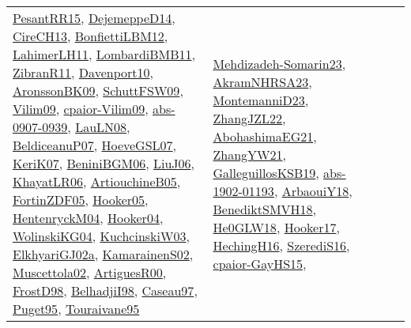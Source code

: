 {\begin{longtable}{lp{3cm}>{\raggedright}p{6cm}>{\raggedright}p{6cm}p{8cm}}
\href{papers/PesantRR15.pdf}{PesantRR15}\cite{PesantRR15}, \href{papers/DejemeppeD14.pdf}{DejemeppeD14}\cite{DejemeppeD14}, \href{papers/CireCH13.pdf}{CireCH13}\cite{CireCH13}, \href{papers/BonfiettiLBM12.pdf}{BonfiettiLBM12}\cite{BonfiettiLBM12}, \href{papers/LahimerLH11.pdf}{LahimerLH11}\cite{LahimerLH11}, \href{papers/LombardiBMB11.pdf}{LombardiBMB11}\cite{LombardiBMB11}, \href{papers/ZibranR11.pdf}{ZibranR11}\cite{ZibranR11}, \href{papers/Davenport10.pdf}{Davenport10}\cite{Davenport10}, \href{papers/AronssonBK09.pdf}{AronssonBK09}\cite{AronssonBK09}, \href{papers/SchuttFSW09.pdf}{SchuttFSW09}\cite{SchuttFSW09}, \href{papers/Vilim09.pdf}{Vilim09}\cite{Vilim09}, \href{papers/cpaior-Vilim09.pdf}{cpaior-Vilim09}\cite{cpaior-Vilim09}, \href{articles/abs-0907-0939.pdf}{abs-0907-0939}\cite{abs-0907-0939}, \href{papers/LauLN08.pdf}{LauLN08}\cite{LauLN08}, \href{papers/BeldiceanuP07.pdf}{BeldiceanuP07}\cite{BeldiceanuP07}, \href{papers/HoeveGSL07.pdf}{HoeveGSL07}\cite{HoeveGSL07}, \href{papers/KeriK07.pdf}{KeriK07}\cite{KeriK07}, \href{papers/BeniniBGM06.pdf}{BeniniBGM06}\cite{BeniniBGM06}, \href{papers/LiuJ06.pdf}{LiuJ06}\cite{LiuJ06}, \href{articles/KhayatLR06.pdf}{KhayatLR06}\cite{KhayatLR06}, \href{papers/ArtiouchineB05.pdf}{ArtiouchineB05}\cite{ArtiouchineB05}, \href{papers/FortinZDF05.pdf}{FortinZDF05}\cite{FortinZDF05}, \href{articles/Hooker05.pdf}{Hooker05}\cite{Hooker05}, \href{papers/HentenryckM04.pdf}{HentenryckM04}\cite{HentenryckM04}, \href{papers/Hooker04.pdf}{Hooker04}\cite{Hooker04}, \href{papers/WolinskiKG04.pdf}{WolinskiKG04}\cite{WolinskiKG04}, \href{articles/KuchcinskiW03.pdf}{KuchcinskiW03}\cite{KuchcinskiW03}, \href{papers/ElkhyariGJ02a.pdf}{ElkhyariGJ02a}\cite{ElkhyariGJ02a}, \href{papers/KamarainenS02.pdf}{KamarainenS02}\cite{KamarainenS02}, \href{papers/Muscettola02.pdf}{Muscettola02}\cite{Muscettola02}, \href{articles/ArtiguesR00.pdf}{ArtiguesR00}\cite{ArtiguesR00}, \href{papers/FrostD98.pdf}{FrostD98}\cite{FrostD98}, \href{articles/BelhadjiI98.pdf}{BelhadjiI98}\cite{BelhadjiI98}, \href{papers/Caseau97.pdf}{Caseau97}\cite{Caseau97}, \href{papers/Puget95.pdf}{Puget95}\cite{Puget95}, \href{papers/Touraivane95.pdf}{Touraivane95}\cite{Touraivane95} & \href{papers/Mehdizadeh-Somarin23.pdf}{Mehdizadeh-Somarin23}\cite{Mehdizadeh-Somarin23}, \href{articles/AkramNHRSA23.pdf}{AkramNHRSA23}\cite{AkramNHRSA23}, \href{articles/MontemanniD23.pdf}{MontemanniD23}\cite{MontemanniD23}, \href{papers/ZhangJZL22.pdf}{ZhangJZL22}\cite{ZhangJZL22}, \href{articles/AbohashimaEG21.pdf}{AbohashimaEG21}\cite{AbohashimaEG21}, \href{articles/ZhangYW21.pdf}{ZhangYW21}\cite{ZhangYW21}, \href{papers/GalleguillosKSB19.pdf}{GalleguillosKSB19}\cite{GalleguillosKSB19}, \href{articles/abs-1902-01193.pdf}{abs-1902-01193}\cite{abs-1902-01193}, \href{papers/ArbaouiY18.pdf}{ArbaouiY18}\cite{ArbaouiY18}, \href{papers/BenediktSMVH18.pdf}{BenediktSMVH18}\cite{BenediktSMVH18}, \href{papers/He0GLW18.pdf}{He0GLW18}\cite{He0GLW18}, \href{papers/Hooker17.pdf}{Hooker17}\cite{Hooker17}, \href{papers/HechingH16.pdf}{HechingH16}\cite{HechingH16}, \href{papers/SzerediS16.pdf}{SzerediS16}\cite{SzerediS16}, \href{papers/cpaior-GayHS15.pdf}{cpaior-GayHS15}\cite{cpaior-GayHS15}, 
\end{longtable}}
